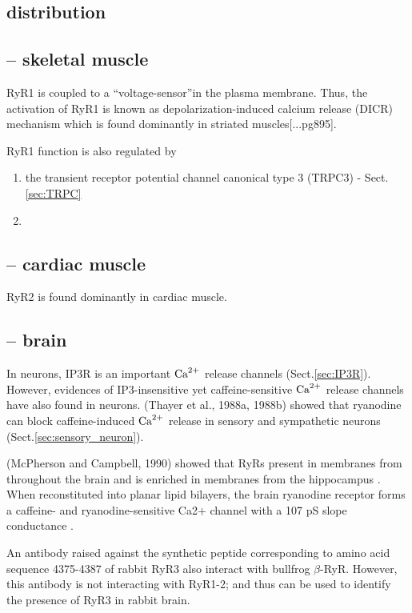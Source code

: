 \subsection{distribution}
 
\subsection{-- skeletal muscle}
\label{sec:RyR1}

RyR1 is coupled to a ``voltage-sensor''in the plasma membrane. Thus, the
activation of RyR1 is known as depolarization-induced calcium release (DICR)
mechanism which is found dominantly in striated muscles[...pg895].

RyR1 function is also regulated by
\begin{enumerate}
  
  \item  the transient receptor potential channel canonical type 3 (TRPC3) -
  Sect.\ref{sec:TRPC}
  
  \item  
\end{enumerate}



\subsection{-- cardiac muscle}
\label{sec:RyR2}

RyR2 is found dominantly in cardiac muscle.

\subsection{-- brain}

In neurons, IP3R is an important ${\text{Ca}^{2+}}$ release channels (Sect.\ref{sec:IP3R}).
However, evidences of IP3-insensitive yet caffeine-sensitive ${\text{Ca}^{2+}}$ release
channels have also found in neurons.
(Thayer et al., 1988a, 1988b) showed that ryanodine can block caffeine-induced
${\text{Ca}^{2+}}$ release in sensory and sympathetic neurons
(Sect.\ref{sec:sensory_neuron}).

(McPherson and Campbell, 1990) showed that RyRs present in membranes from
throughout the brain and is enriched in membranes from the hippocampus .
When reconstituted into planar lipid bilayers, the brain ryanodine receptor
forms a caffeine- and ryanodine-sensitive Ca2+ channel with a 107 pS slope
conductance \citep{McPherson1991}.

An antibody raised against the synthetic peptide corresponding to amino acid
sequence 4375-4387 of rabbit RyR3 also interact with bullfrog $\beta$-RyR.
However, this antibody is not interacting with RyR1-2; and thus can be used to
identify the presence of RyR3 in rabbit brain.

